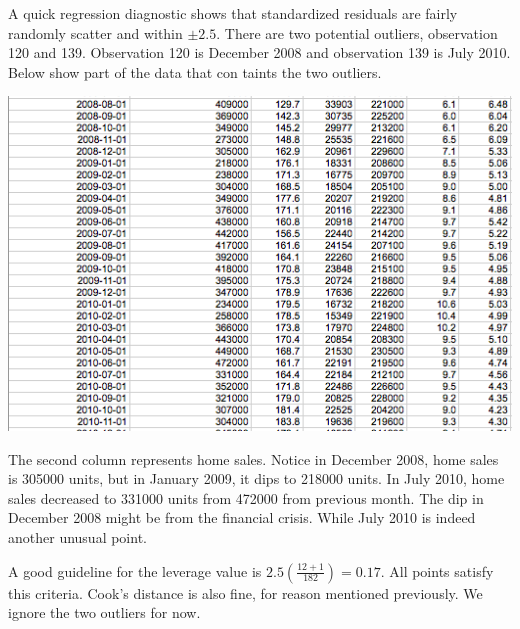 \documentclass[a4 paper, 11 pt]{article}
\begin{document}
A quick regression diagnostic shows that standardized residuals are fairly randomly scatter and within $\pm 2.5$. There are two potential outliers, observation 120 and 139. Observation 120 is December 2008 and observation 139 is July 2010. Below show part of the data that con taints the two outliers.

\begin{center}
\includegraphics[scale=0.6]{outlier}
\end{center}

The second column represents home sales. Notice in December 2008, home sales is 305000 units, but in January 2009, it dips to 218000 units. In July 2010, home sales decreased to 331000 units from 472000 from previous month. The dip in December 2008 might be from the financial crisis. While July 2010 is indeed another unusual point.

A good guideline for the leverage value is $2.5\left(\frac{12+1}{182}\right) = 0.17$. All points satisfy this criteria. Cook's distance is also fine, for reason mentioned previously. We ignore the two outliers for now.
\end{document}
